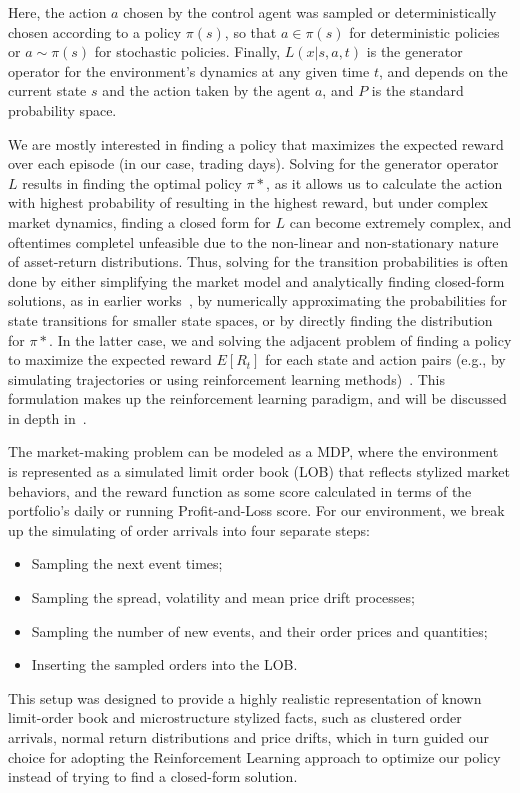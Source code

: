\documentclass[11pt]{article}
\begin{document}
    Here, the action $a$ chosen by the control agent was sampled or deterministically chosen according to a policy $\pi(s)$,
    so that $a \in \pi(s)$ for deterministic policies or $a \sim \pi(s)$ for stochastic policies.
    Finally, \( L(x|s, a, t) \) is the generator operator for the environment's dynamics at any given time \( t \),
    and depends on the current state $s$ and the action taken by the agent $a$, and $P$ is the standard probability space.

    We are mostly interested in finding a policy that maximizes the expected reward over each episode (in our case, trading days).
    Solving for the generator operator $L$ results in finding the optimal policy $\pi*$, as it allows us to calculate
    the action with highest probability of resulting in the highest reward, but under complex market dynamics, 
    finding a closed form for $L$ can become extremely complex, 
    and oftentimes completel unfeasible due to the non-linear and non-stationary nature of asset-return distributions.
    Thus, solving for the transition probabilities is often done by either simplifying the market model and
    analytically finding closed-form solutions, as in earlier works~\citep{Avellaneda2008, Gueant2017},
    by numerically approximating the probabilities for state transitions for smaller state spaces,
    or by directly finding the distribution for $\pi*$. 
    In the latter case, we and solving the adjacent problem of finding a 
    policy to maximize the expected reward $E[R_t]$ for each state and action pairs
    (e.g., by simulating trajectories or using reinforcement learning methods)~\citep{Gueant2022, Gasperov2022, Guo2023}.
    This formulation makes up the reinforcement learning paradigm, and will be discussed in depth in~.
    
    The market-making problem can be modeled as a MDP,
    where the environment is represented as a simulated limit order book (LOB) that reflects stylized market behaviors,
    and the reward function as some score calculated in terms of the portfolio's daily or running Profit-and-Loss score.
    For our environment, we break up the simulating of order arrivals into four separate steps:
    \begin{itemize}
        \item Sampling the next event times;
        \item Sampling the spread, volatility and mean price drift processes;
        \item Sampling the number of new events, and their order prices and quantities;
        \item Inserting the sampled orders into the LOB.
    \end{itemize}
    This setup was designed to provide a highly realistic representation of known limit-order book and
    microstructure stylized facts, such as clustered order arrivals, normal return distributions and price drifts,
    which in turn guided our choice for adopting the Reinforcement Learning approach to optimize our policy instead of trying
    to find a closed-form solution.
\end{document}
